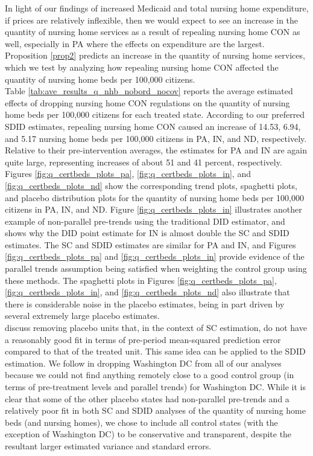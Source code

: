 \documentclass[../Main.tex]{subfiles}
\begin{document}
\indent In light of our findings of increased Medicaid and total nursing home expenditure, if prices are relatively inflexible, then we would expect to see an increase in the quantity of nursing home services as a result of repealing nursing home CON as well, especially in PA where the effects on expenditure are the largest. Proposition \ref{prop2} predicts an increase in the quantity of nursing home services, which we test by analyzing how repealing nursing home CON affected the quantity of nursing home beds per 100,000 citizens.\\
\indent Table \ref{tab:ave_results_q_nhb_nobord_nocov} reports the average estimated effects of dropping nursing home CON regulations on the quantity of nursing home beds per 100,000 citizens for each treated state. According to our preferred SDID estimates, repealing nursing home CON caused an increase of 14.53, 6.94, and 5.17 nursing home beds per 100,000 citizens in PA, IN, and ND, respectively. Relative to their pre-intervention averages, the estimates for PA and IN are again quite large, representing increases of about 51 and 41 percent, respectively. Figures \ref{fig:q_certbeds_plots_pa}, \ref{fig:q_certbeds_plots_in}, and \ref{fig:q_certbeds_plots_nd} show the corresponding trend plots, spaghetti plots, and placebo distribution plots for the quantity of nursing home beds per 100,000 citizens in PA, IN, and ND. Figure \ref{fig:q_certbeds_plots_in} illustrates another example of non-parallel pre-trends using the traditional DID estimator, and shows why the DID point estimate for IN is almost double the SC and SDID estimates. The SC and SDID estimates are similar for PA and IN, and Figures \ref{fig:q_certbeds_plots_pa} and \ref{fig:q_certbeds_plots_in} provide evidence of the parallel trends assumption being satisfied when weighting the control group using these methods. The spaghetti plots in Figures \ref{fig:q_certbeds_plots_pa}, \ref{fig:q_certbeds_plots_in}, and \ref{fig:q_certbeds_plots_nd} also illustrate that there is considerable noise in the placebo estimates, being in part driven by several extremely large placebo estimates.\\
\indent \citet{abadie2010synthetic} discuss removing placebo units that, in the context of SC estimation, do not have a reasonably good fit in terms of pre-period mean-squared prediction error compared to that of the treated unit. This same idea can be applied to the SDID estimation. We follow \citet{abadie2010synthetic} in dropping Washington DC from all of our analyses because we could not find anything remotely close to a good control group (in terms of pre-treatment levels and parallel trends) for Washington DC. While it is clear that some of the other placebo states had non-parallel pre-trends and a relatively poor fit in both SC and SDID analyses of the quantity of nursing home beds (and nursing homes), we chose to include all control states (with the exception of Washington DC) to be conservative and transparent, despite the resultant larger estimated variance and standard errors.\\
\end{document}
